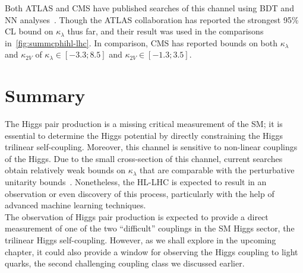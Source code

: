 Both ATLAS and CMS have published searches of this channel using  BDT and NN analyses~\cite{ATLAS:2021jki,CMS:2020tkr}. Though the ATLAS collaboration has reported the strongest 95\% CL bound on $\kappa_\lambda$ thus far, and their result was used in the comparisons in~\autoref{fig:summcphihl-lhc}. In comparison, CMS has reported bounds on both $\kappa_\lambda$ and $\kappa_{2V}$ of $\kappa_{\lambda} \in [-3.3;8.5]$ and $\kappa_{2V} \in [-1.3; 3.5]$.                                                                                       

\section{Summary \label{summtrilinear}  }
The Higgs pair production is a missing critical measurement of the SM; it is essential to determine the Higgs potential by directly constraining the Higgs trilinear self-coupling. Moreover, this channel is sensitive to non-linear couplings of the Higgs. Due to the small cross-section of this channel, current searches obtain relatively weak bounds on $\kappa_{\lambda}$ that are comparable with the perturbative unitarity bounds~\cite{DiLuzio:2017tfn}. Nonetheless, the HL-LHC is expected to result in an observation or even discovery of this process, particularly with the help of advanced machine learning techniques.\\ The observation of Higgs pair production is expected to provide a direct measurement of one of the two ``difficult'' couplings in the SM Higgs sector,  the trilinear Higgs self-coupling. However, as we shall explore in the upcoming chapter, it could also provide a window for observing the Higgs coupling to light quarks, the second challenging coupling class we discussed earlier.
